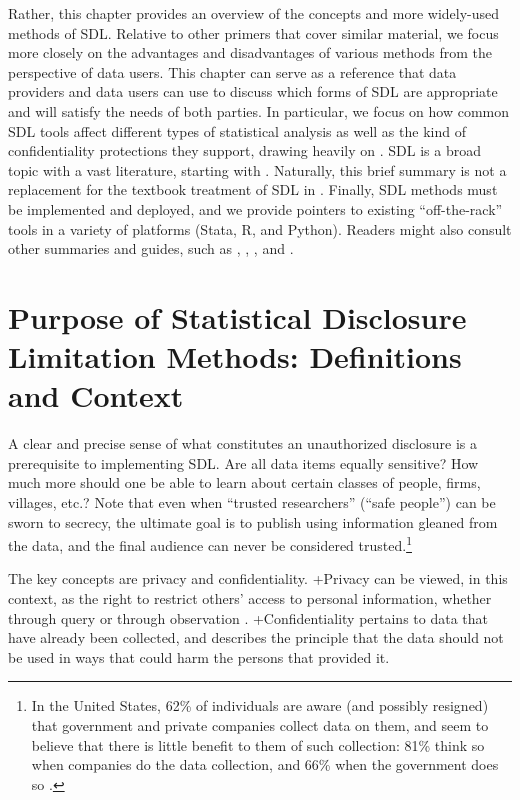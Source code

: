 \documentclass[
]{book}
\begin{document}
Rather, this chapter provides an overview of the concepts and more widely-used methods of SDL. Relative to other primers that cover similar material, we focus more closely on the advantages and disadvantages of various methods from the perspective of data users. This chapter can serve as a reference that data providers and data users can use to discuss which forms of SDL are appropriate and will satisfy the needs of both parties. In particular, we focus on how common SDL tools affect different types of statistical analysis as well as the kind of confidentiality protections they support, drawing heavily on \citet{abowd_economic_2015}. SDL is a broad topic with a vast literature, starting with \citet{fellegi_question_1972}. Naturally, this brief summary is not a replacement for the textbook treatment of SDL in \citet{duncan_statistical_2011}. Finally, SDL methods must be implemented and deployed, and we provide pointers to existing ``off-the-rack'' tools in a variety of platforms (Stata, R, and Python). Readers might also consult other summaries and guides, such as \citet{dupriez_dissemination_2010}, \citet{world_bank_dime_nodate}, \citet{kopper_j-pal_2020}, and \citet{liu_statistical_2020}.

\hypertarget{purpose-of-statistical-disclosure-limitation-methods-definitions-and-context}{%
\section{Purpose of Statistical Disclosure Limitation Methods: Definitions and Context}\label{purpose-of-statistical-disclosure-limitation-methods-definitions-and-context}}

A clear and precise sense of what constitutes an unauthorized disclosure is a prerequisite to implementing SDL. Are all data items equally sensitive? How much more should one be able to learn about certain classes of people, firms, villages, etc.? Note that even when ``trusted researchers'' (``safe people'') can be sworn to secrecy, the ultimate goal is to publish using information gleaned from the data, and the final audience can never be considered trusted.\footnote{In the United States, 62\% of individuals are aware (and possibly resigned) that government and private companies collect data on them, and seem to believe that there is little benefit to them of such collection: 81\% think so when companies do the data collection, and 66\% when the government does so \citep{auxier_americans_2019}.}

The key concepts are privacy and confidentiality. +Privacy\textbar{} can be viewed, in this context, as the right to restrict others' access to personal information, whether through query or through observation \citep{hirshleifer_privacy_1980}. +Confidentiality\textbar{} pertains to data that have already been collected, and describes the principle that the data should not be used in ways that could harm the persons that provided it.
\end{document}
